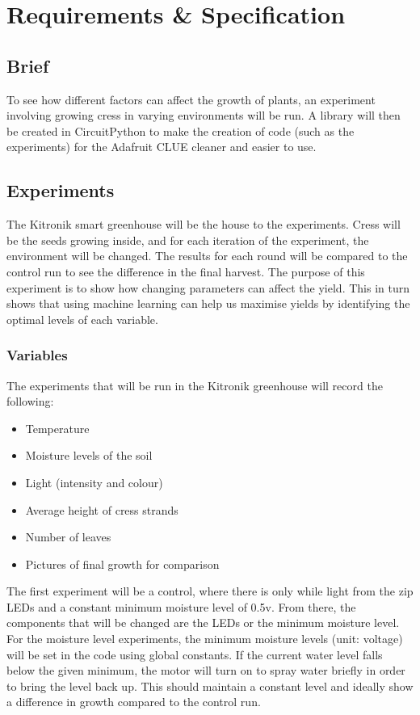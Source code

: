 \chapter{Requirements \& Specification}

\section{Brief}

To see how different factors can affect the growth of plants, an experiment involving growing cress in varying environments will be run. A library will then be created in CircuitPython to make the creation of code (such as the experiments) for the Adafruit CLUE cleaner and easier to use.

\section{Experiments}

The Kitronik smart greenhouse will be the house to the experiments. Cress will be the seeds growing inside, and for each iteration of the experiment, the environment will be changed. The results for each round will be compared to the control run to see the difference in the final harvest. The purpose of this experiment is to show how changing parameters can affect the yield. This in turn shows that using machine learning can help us maximise yields by identifying the optimal levels of each variable.

\subsection{Variables}

The experiments that will be run in the Kitronik greenhouse will record the following:

\begin{itemize}
    \item Temperature
    \item Moisture levels of the soil
    \item Light (intensity and colour)
    \item Average height of cress strands
    \item Number of leaves
    \item Pictures of final growth for comparison
\end{itemize}

The first experiment will be a control, where there is only while light from the zip LEDs and a constant minimum moisture level of 0.5v. From there, the components that will be changed are the LEDs or the minimum moisture level. For the moisture level experiments, the minimum moisture levels (unit: voltage) will be set in the code using global constants. If the current water level falls below the given minimum, the motor will turn on to spray water briefly in order to bring the level back up. This should maintain a constant level and ideally show a difference in growth compared to the control run.

